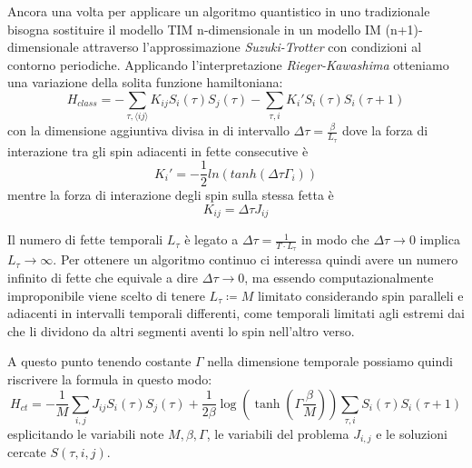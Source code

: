 Ancora una volta per applicare un algoritmo quantistico in uno tradizionale bisogna sostituire il modello TIM n-dimensionale in un modello IM (n+1)-dimensionale attraverso l'approssimazione \textit{Suzuki-Trotter} con condizioni al contorno periodiche.
Applicando l'interpretazione \textit{Rieger-Kawashima} otteniamo una variazione della solita funzione hamiltoniana:
$$H_{class} = - \sum_{\tau,\langle ij \rangle} K_{ij} S_i(\tau) S_j(\tau) - \sum_{\tau, i} K_{i}' S_i(\tau) S_i(\tau+1)$$
con la dimensione aggiuntiva divisa in  di intervallo $\Delta\tau = \frac{\beta}{L_{\tau}}$
dove la forza di interazione tra gli spin adiacenti in fette consecutive è
$$K_{i}' = - \frac{1}{2} ln( tanh( \Delta \tau \Gamma_i) )$$
mentre la forza di interazione degli spin sulla stessa fetta è
$$K_{ij} = \Delta \tau J_{ij}$$

Il numero di fette temporali $L_{\tau}$ è legato a $\Delta \tau = \frac{1}{T \cdot L_{\tau}}$ in modo che $\Delta \tau \to 0$ implica $L_{\tau} \to \infty$.
Per ottenere un algoritmo continuo ci interessa quindi avere un numero infinito di fette che equivale a dire $\Delta \tau \to 0$, ma essendo computazionalmente improponibile viene scelto di tenere $L_{\tau} \coloneqq M$ limitato considerando spin paralleli e adiacenti in intervalli temporali differenti, come  temporali limitati agli estremi dai  che li dividono da altri segmenti aventi lo spin nell'altro verso.

A questo punto tenendo costante $\Gamma$ nella dimensione temporale possiamo quindi riscrivere la formula in questo modo:
$$H_{ct} = - \frac{1}{M} \sum_{i,j} J_{ij} S_i(\tau) S_j(\tau) + \frac{1}{2 \beta} \log{(\tanh{(\Gamma \frac{\beta}{M})})} \sum_{\tau, i} S_i(\tau) S_i(\tau+1)$$
esplicitando le variabili note $M, \beta, \Gamma$, le variabili del problema $J_{i,j}$ e le soluzioni cercate $S(\tau,i,j)$.

